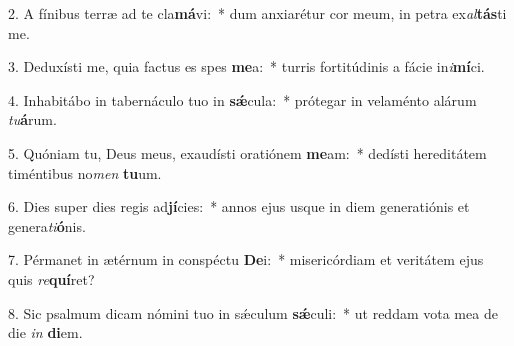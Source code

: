 2. A fínibus terræ ad te cla\textbf{má}vi:~*  dum anxiarétur cor meum, in petra ex\textit{al}\textbf{tás}ti me.\

3. Deduxísti me, quia factus es spes \textbf{me}a:~*  turris fortitúdinis a fácie in\textit{i}\textbf{mí}ci.\

4. Inhabitábo in tabernáculo tuo in \textbf{sǽ}cula:~*  prótegar in velaménto alárum \textit{tu}\textbf{á}rum.\

5. Quóniam tu, Deus meus, exaudísti oratiónem \textbf{me}am:~*  dedísti hereditátem timéntibus no\textit{men} \textbf{tu}um.\

6. Dies super dies regis ad\textbf{jí}cies:~*  annos ejus usque in diem generatiónis et genera\textit{ti}\textbf{ó}nis.\

7. Pérmanet in ætérnum in conspéctu \textbf{De}i:~*  misericórdiam et veritátem ejus quis \textit{re}\textbf{quí}ret?\

8. Sic psalmum dicam nómini tuo in sǽculum \textbf{sǽ}culi:~*  ut reddam vota mea de die \textit{in} \textbf{di}em.\

